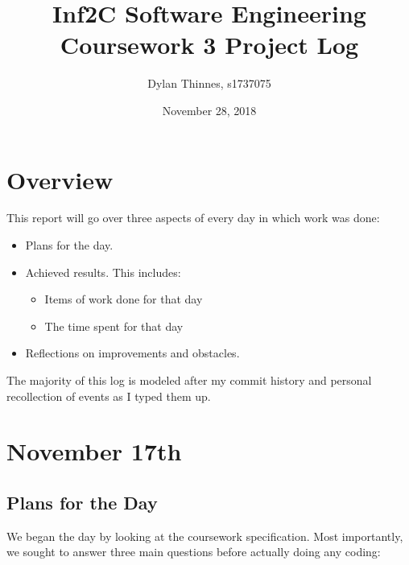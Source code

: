 \documentclass[titlepage, 12pt]{extarticle}
\begin{document}
\title{{\bf Inf2C Software Engineering \\ Coursework 3 Project Log}}
\author{Dylan Thinnes, s1737075}
\date{November 28, 2018}
\maketitle

\section{Overview}
This report will go over three aspects of every day in which work was done:
\begin{itemize}
    \item Plans for the day.
    \item Achieved results. This includes:
        \begin{itemize}
            \item Items of work done for that day
            \item The time spent for that day
        \end{itemize}
    \item Reflections on improvements and obstacles.
\end{itemize}

The majority of this log is modeled after my commit history and personal
recollection of events as I typed them up.

\section*{November 17th}
\subsection{Plans for the Day}
We began the day by looking at the coursework specification. Most importantly,
we sought to answer three main questions before actually doing any coding:
\end{document}
